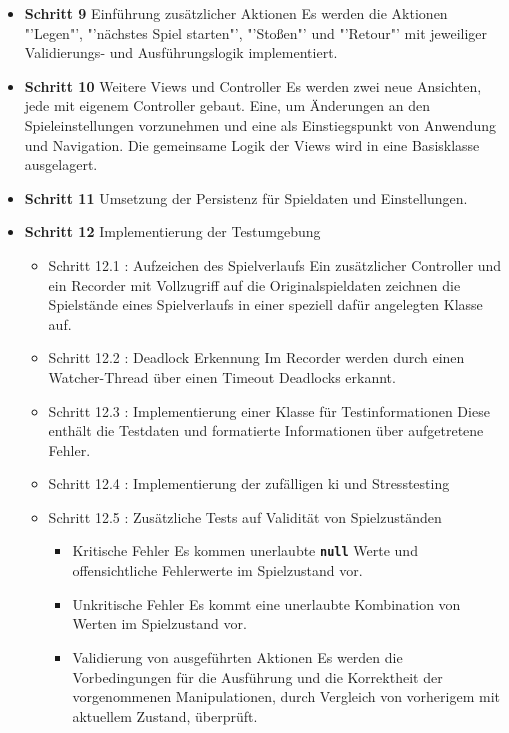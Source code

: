 \documentclass[
							a4paper, 
							11pt, 
							openany, 
							liststotoc,
							parskip=half, 
   							headings=normal
						]{scrreprt}
\begin{document}
{\begin{itemize}
	\item \textbf{Schritt 9} Einführung zusätzlicher Aktionen\newline
Es werden die Aktionen "'Legen"', "'nächstes Spiel starten"', "'Stoßen"' und "'Retour"' mit jeweiliger Validierungs- und Ausführungslogik implementiert.
	\item \textbf{Schritt 10} Weitere Views und Controller\newline
Es werden zwei neue Ansichten, jede mit eigenem Controller gebaut. Eine, um Änderungen an den Spieleinstellungen vorzunehmen und eine als Einstiegspunkt von Anwendung und Navigation. Die gemeinsame Logik der Views wird in eine Basisklasse ausgelagert.
	\item \textbf{Schritt 11} Umsetzung der Persistenz für Spieldaten und Einstellungen.
	\item \textbf{Schritt 12} Implementierung der Testumgebung
	\begin{itemize}
	\item Schritt 12.1 : Aufzeichen des Spielverlaufs\newline
Ein zusätzlicher Controller und ein Recorder mit Vollzugriff auf die Originalspieldaten zeichnen die Spielstände eines Spielverlaufs in einer speziell dafür angelegten Klasse auf.
	\item Schritt 12.2 : Deadlock Erkennung\newline
Im Recorder werden durch einen Watcher-Thread über einen Timeout Deadlocks erkannt.
	\item Schritt 12.3 : Implementierung einer Klasse für Testinformationen\newline
Diese enthält die Testdaten und formatierte Informationen über aufgetretene Fehler.
	\item Schritt 12.4 : Implementierung der zufälligen \acs{ki} und Stresstesting
	\item Schritt 12.5 : Zusätzliche Tests auf Validität von Spielzuständen
	\begin{itemize}
		\item Kritische Fehler\newline 
Es kommen unerlaubte \textbf{\texttt{null}} Werte und offensichtliche Fehlerwerte im Spielzustand vor.
		\item Unkritische Fehler\newline 
Es kommt eine unerlaubte Kombination von Werten im Spielzustand vor.
		\item Validierung von ausgeführten Aktionen\newline
Es werden die Vorbedingungen für die Ausführung und die Korrektheit der vorgenommenen Manipulationen, durch Vergleich von vorherigem mit aktuellem Zustand, überprüft.

\end{itemize}
\end{itemize}
\end{itemize}}
\end{document}
